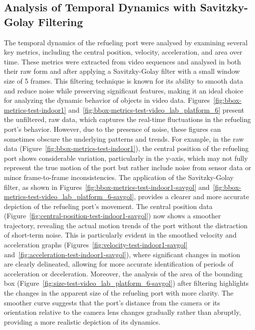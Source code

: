 \documentclass[12pt,oneside]{book} %
\begin{document}
\subsection{Analysis of Temporal Dynamics with Savitzky-Golay Filtering}
The temporal dynamics of the refueling port were analysed by examining several
key metrics, including the central position, velocity, acceleration, and area
over time. These metrics were extracted from video sequences and analysed in
both their raw form and after applying a Savitzky-Golay filter with a small
window size of 5 frames. This filtering technique is known for its ability to
smooth data and reduce noise while preserving significant features, making it
an ideal choice for analyzing the dynamic behavior of objects in video data.
Figures~\ref{fig:bbox-metrics-test-indoor1}
and~\ref{fig:bbox-metrics-test-video_lab_platform_6} present the unfiltered,
raw data, which captures the real-time fluctuations in the refueling port's
behavior. However, due to the presence of noise, these figures can sometimes
obscure the underlying patterns and trends. For example, in the raw data
(Figure~\ref{fig:bbox-metrics-test-indoor1}), the central position of the
refueling port shows considerable variation, particularly in the y-axis, which
may not fully represent the true motion of the port but rather include noise
from sensor data or minor frame-to-frame inconsistencies. The application of
the Savitzky-Golay filter, as shown in
Figures~\ref{fig:bbox-metrics-test-indoor1-savgol}
and~\ref{fig:bbox-metrics-test-video_lab_platform_6-savgol}, provides a clearer
and more accurate depiction of the refueling port's movement. The central
position data (Figure~\ref{fig:central-position-test-indoor1-savgol}) now shows
a smoother trajectory, revealing the actual motion trends of the port without
the distraction of short-term noise. This is particularly evident in the
smoothed velocity and acceleration graphs
(Figures~\ref{fig:velocity-test-indoor1-savgol}
and~\ref{fig:acceleration-test-indoor1-savgol}), where significant changes in
motion are clearly delineated, allowing for more accurate identification of
periods of acceleration or deceleration. Moreover, the analysis of the area of
the bounding box (Figure~\ref{fig:size-test-video_lab_platform_6-savgol}) after
filtering highlights the changes in the apparent size of the refueling port
with more clarity. The smoother curve suggests that the port’s distance from
the camera or its orientation relative to the camera lens changes gradually
rather than abruptly, providing a more realistic depiction of its dynamics.
\end{document}
